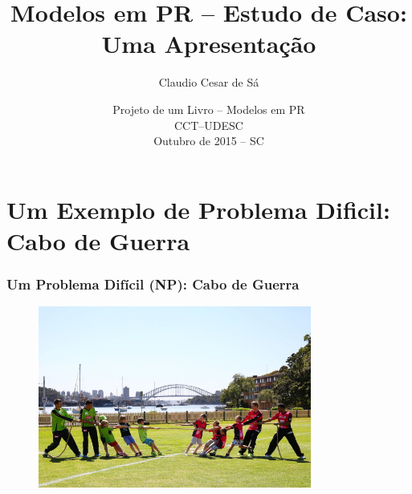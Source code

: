 \documentclass{beamer}
\title[Modelos em PR -- Estudo de Caso] %
{Modelos em PR -- Estudo de Caso: \\ Uma Apresentação}
\author[Claudio Cesar de Sá] %
{Claudio Cesar de Sá\inst{1}}
\institute[] %
{
  \inst{1}%
  Departamento de Ciência da Computação -- DCC\\
  Centro de Ciências Tecnológicas -- CCT\\
 Universidade do Estado de Santa Catarina -- UDESC
}
\date[01 out 2015] %
{Projeto de um Livro -- Modelos em PR\\
CCT--UDESC\\ Outubro de 2015 -- SC}
\begin{document}
\begin{frame}
  \titlepage
\end{frame}









\section{Um Exemplo de Problema Dificil: Cabo de Guerra}


\begin{frame}
\frametitle{Um Problema Difícil (NP): Cabo de Guerra}

\begin{figure}[ht!]
 \centering
 \includegraphics[width=0.8\textwidth , height=0.6\textheight]{cabo-de-guerra.jpg}
\end{figure}


\end{frame}
\end{document}
